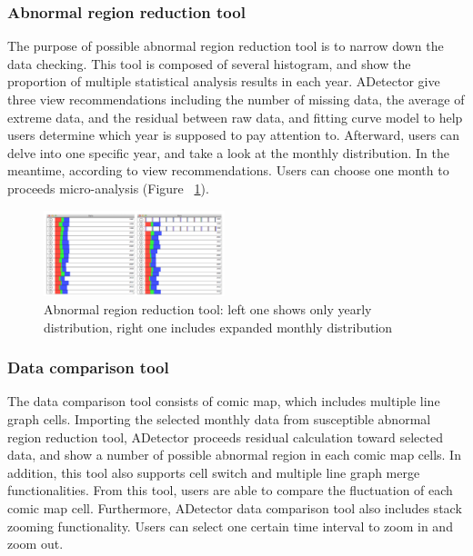 \documentclass{vgtc}                          %
\begin{document}
\subsubsection{Abnormal region reduction tool}
The purpose of possible abnormal region reduction tool is to narrow down the data checking. This tool is composed of several histogram, and show the proportion of multiple statistical analysis results in each year. ADetector give three view recommendations including the number of missing data, the average of extreme data, and the residual between raw data, and fitting curve model to help users determine which year is supposed to pay attention to. Afterward, users can delve into one specific year, and take a look at the monthly distribution. In the meantime, according to view recommendations. Users can choose one month to proceeds micro-analysis (Figure ~\ref{fig:region}).

\begin{figure}[htb]
	\centering
	\includegraphics[width=0.47\textwidth]{region.png}
	\caption{Abnormal region reduction tool: left one shows only yearly distribution, right one includes expanded monthly distribution}
	\label{fig:region}
\end{figure}

\subsubsection{Data comparison tool}

The data comparison tool consists of comic map, which includes multiple line graph cells. Importing the selected monthly data from susceptible abnormal region reduction tool, ADetector proceeds residual calculation toward selected data, and show a number of possible abnormal region in each comic map cells. In addition, this tool also supports cell switch and multiple line graph merge functionalities. From this tool, users are able to compare the fluctuation of each comic map cell. Furthermore, ADetector data comparison tool also includes stack zooming functionality. Users can select one certain time interval to zoom in and zoom out. 

\end{document}
